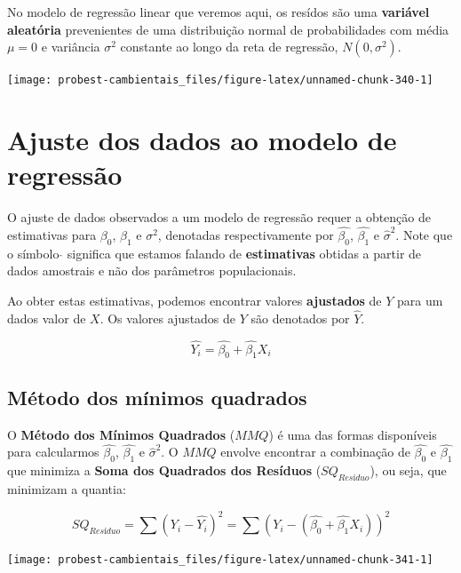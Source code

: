 \documentclass[
]{book}
\begin{document}
No modelo de regressão linear que veremos aqui, os resídos são uma \textbf{variável aleatória} prevenientes de uma distribuição normal de probabilidades com média \(\mu = 0\) e variância \(\sigma^2\) constante ao longo da reta de regressão, \(N(0, \sigma^2)\).

\begin{center}\texttt{[image: probest-cambientais\_files/figure-latex/unnamed-chunk-340-1]} \end{center}

\hypertarget{ajuste-dos-dados-ao-modelo-de-regressuxe3o}{%
\section{Ajuste dos dados ao modelo de regressão}\label{ajuste-dos-dados-ao-modelo-de-regressuxe3o}}

O ajuste de dados observados a um modelo de regressão requer a obtenção de estimativas para \(\beta_0\), \(\beta_1\) e \(\sigma^2\), denotadas respectivamente por \(\hat{\beta_0}\), \(\hat{\beta_1}\) e \(\hat{\sigma}^2\). Note que o símbolo \(\hat{}\) significa que estamos falando de \textbf{estimativas} obtidas a partir de dados amostrais e não dos parâmetros populacionais.

Ao obter estas estimativas, podemos encontrar valores \textbf{ajustados} de \(Y\) para um dados valor de \(X\). Os valores ajustados de \(Y\) são denotados por \(\hat{Y}\).

\[\hat{Y_i} = \hat{\beta_0} + \hat{\beta_1}X_i\]

\hypertarget{muxe9todo-dos-muxednimos-quadrados}{%
\subsection{Método dos mínimos quadrados}\label{muxe9todo-dos-muxednimos-quadrados}}

O \textbf{Método dos Mínimos Quadrados} (\(MMQ\)) é uma das formas disponíveis para calcularmos \(\hat{\beta_0}\), \(\hat{\beta_1}\) e \(\hat{\sigma}^2\). O \(MMQ\) envolve encontrar a combinação de \(\hat{\beta_0}\) e \(\hat{\beta_1}\) que minimiza a \textbf{Soma dos Quadrados dos Resíduos} (\(SQ_{Resíduo}\)), ou seja, que minimizam a quantia:

\[SQ_{Resíduo} = \sum{(Y_i-\hat{Y_ i})^2} = \sum{(Y_i-(\hat{\beta_0} + \hat{\beta_1}X_i))^2}\]

\begin{center}\texttt{[image: probest-cambientais\_files/figure-latex/unnamed-chunk-341-1]} \end{center}
\end{document}
